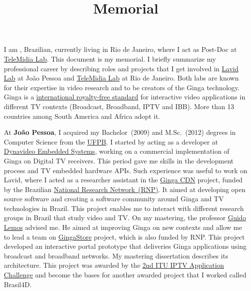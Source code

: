 \documentclass[10pt,a4paper,sans,colorlinks]{moderncv}
\title{Memorial}
\begin{document}
\hfHyperrefSetupBlueLinks
\makecvtitle

\setlength{\parindent}{15pt}
I am \myname, Brazilian, currently living in Rio de Janeiro, where I act as Post-Doc at \href{http://telemidia.puc-rio.br/}{TeleMidia Lab}.
This document is my memorial.
I briefly summarize my professional career by describing roles and projects that I get involved in \href{http://www.lavid.ufpb.br}{Lavid Lab} at João Pessoa and \href{http://telemidia.puc-rio.br/}{TeleMidia Lab} at Rio de Janeiro.
Both labs are known for their expertise in video research and to be creators of the Ginga technology.
Ginga is a \href{https://www.itu.int/rec/T-REC-H.761}{international royalty-free standard} for interactive video applications in different TV contexts (Broadcast, Broadband, IPTV and IBB).
More than 13 countries among South America and Africa adopt it.

At \textbf{João Pessoa}, I acquired my Bachelor~(2009) and M.Sc.~(2012) degrees in Computer Science from the \href{www.ufpb.br}{UFPB}.
I started by acting as a developer at \href{https://www.dynavideo.com.br}{Dynavideo Embedded Systems}, working on a commercial implementation of Ginga on Digital TV receivers.
This period gave me skills in the development process and TV embedded hardware APIs.
Such experience was useful to work on Lavid, where I acted as a researcher assistant in
the \href{http://www.redetic.rnp.br/ctic/2019/01/29/gingarap-gingafrevo/}{Ginga CDN}
project, funded by the Brazilian \href{https://www.rnp.br}{ National Research Network~(RNP)}.
It aimed at developing open source software and creating a software community around Ginga and TV technologies in Brazil.
This project enables me to interact with different research groups in Brazil that study video and TV.
On my mastering, the professor \href{https://www.linkedin.com/in/guido-lemos-5361a48/?originalSubdomain=br}{Guido Lemos} advised me.
He aimed at improving Ginga on new contexts and allow me to lead a team on \href{http://www.redetic.rnp.br/ctic/2019/01/29/ginga-appstore/}{GingaStore} project, which is also funded by RNP.
This project developed an interactive portal prototype that deliveries Ginga applications using broadcast and broadband networks.
My mastering dissertation describes its architecture.
This project was awarded by the \href{http://itu.int/en/ITU-T/challenges/pages/iptv.aspx}{2nd ITU IPTV Application Challenge} and become the bases for another awarded project that I worked called Brasil4D.
\end{document}

